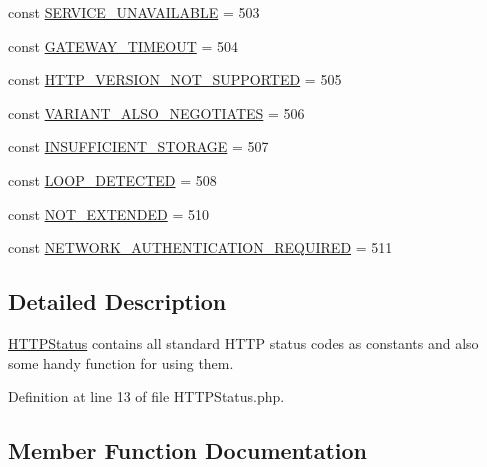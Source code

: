 \begin{DoxyCompactItemize}
const \hyperlink{classlibresignage_1_1api_1_1HTTPStatus_a2070b4e1a839fce76d2d46f8638c6972}{S\+E\+R\+V\+I\+C\+E\+\_\+\+U\+N\+A\+V\+A\+I\+L\+A\+B\+LE} = 503
\item 
const \hyperlink{classlibresignage_1_1api_1_1HTTPStatus_a314f23922063f1eb991c57eaede5e300}{G\+A\+T\+E\+W\+A\+Y\+\_\+\+T\+I\+M\+E\+O\+UT} = 504
\item 
const \hyperlink{classlibresignage_1_1api_1_1HTTPStatus_aea6729b78bd7ae820f5b266e8758cd43}{H\+T\+T\+P\+\_\+\+V\+E\+R\+S\+I\+O\+N\+\_\+\+N\+O\+T\+\_\+\+S\+U\+P\+P\+O\+R\+T\+ED} = 505
\item 
const \hyperlink{classlibresignage_1_1api_1_1HTTPStatus_a6bbbcb0669a29da199b3ca04d64a54bf}{V\+A\+R\+I\+A\+N\+T\+\_\+\+A\+L\+S\+O\+\_\+\+N\+E\+G\+O\+T\+I\+A\+T\+ES} = 506
\item 
const \hyperlink{classlibresignage_1_1api_1_1HTTPStatus_a6bcda0741b3fa8a773f2c56b7b8e6a9a}{I\+N\+S\+U\+F\+F\+I\+C\+I\+E\+N\+T\+\_\+\+S\+T\+O\+R\+A\+GE} = 507
\item 
const \hyperlink{classlibresignage_1_1api_1_1HTTPStatus_af8adc946346fc849d4a01ff76c6efc19}{L\+O\+O\+P\+\_\+\+D\+E\+T\+E\+C\+T\+ED} = 508
\item 
const \hyperlink{classlibresignage_1_1api_1_1HTTPStatus_a5db6cbf5e4529e23e592ce191ac46f8c}{N\+O\+T\+\_\+\+E\+X\+T\+E\+N\+D\+ED} = 510
\item 
const \hyperlink{classlibresignage_1_1api_1_1HTTPStatus_a576e6c1c8c3fd0f364f8370f4f6f611e}{N\+E\+T\+W\+O\+R\+K\+\_\+\+A\+U\+T\+H\+E\+N\+T\+I\+C\+A\+T\+I\+O\+N\+\_\+\+R\+E\+Q\+U\+I\+R\+ED} = 511
\end{DoxyCompactItemize}


\subsection{Detailed Description}
\hyperlink{classlibresignage_1_1api_1_1HTTPStatus}{H\+T\+T\+P\+Status} contains all standard H\+T\+TP status codes as constants and also some handy function for using them. 

Definition at line 13 of file H\+T\+T\+P\+Status.\+php.



\subsection{Member Function Documentation}
\mbox{\label{classlibresignage_1_1api_1_1HTTPStatus_accedfb8d947fa4ab52f5f841b0a1d86d}} 
